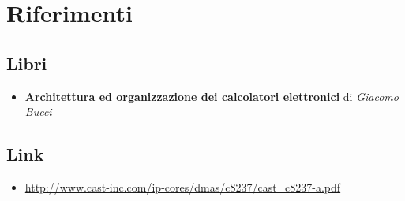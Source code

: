 \documentclass[11pt]{book}
\begin{document}
\section{Riferimenti}

\subsection{Libri}
\begin{itemize}
\item \textbf{Architettura ed organizzazione dei calcolatori
    elettronici} di \textit{Giacomo Bucci}
\end{itemize}

\subsection{Link}
\begin{itemize}
\item \url{http://www.cast-inc.com/ip-cores/dmas/c8237/cast_c8237-a.pdf}
\end{itemize}
\end{document}
